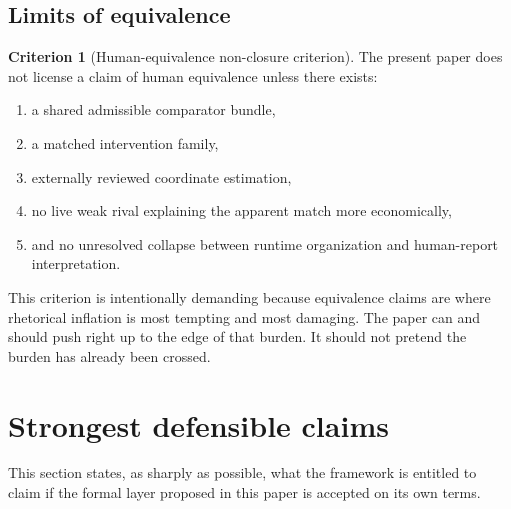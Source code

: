 \documentclass[11pt,a4paper]{article}
\theoremstyle{definition}
\newtheorem{criterion}[theorem]{Criterion}
\begin{document}
\subsection{Limits of equivalence}
\begin{criterion}[Human-equivalence non-closure criterion]
The present paper does not license a claim of human equivalence unless there exists:
\begin{enumerate}[leftmargin=1.5em]
\item a shared admissible comparator bundle,
\item a matched intervention family,
\item externally reviewed coordinate estimation,
\item no live weak rival explaining the apparent match more economically,
\item and no unresolved collapse between runtime organization and human-report interpretation.
\end{enumerate}
\end{criterion}

This criterion is intentionally demanding because equivalence claims are where rhetorical inflation is most tempting and most damaging. The paper can and should push right up to the edge of that burden. It should not pretend the burden has already been crossed.

\section{Strongest defensible claims}
This section states, as sharply as possible, what the framework is entitled to claim if the formal layer proposed in this paper is accepted on its own terms.
\end{document}
